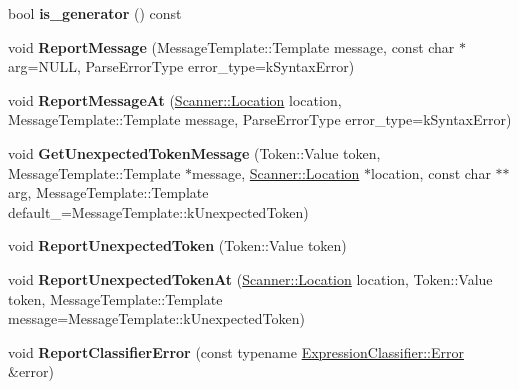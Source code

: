 \begin{DoxyCompactItemize}
\item 
bool {\bfseries is\+\_\+generator} () const \hypertarget{classv8_1_1internal_1_1_parser_base_a62553b4e86b78b41c89deb9d81b0f757}{}\label{classv8_1_1internal_1_1_parser_base_a62553b4e86b78b41c89deb9d81b0f757}

\item 
void {\bfseries Report\+Message} (Message\+Template\+::\+Template message, const char $\ast$arg=N\+U\+LL, Parse\+Error\+Type error\+\_\+type=k\+Syntax\+Error)\hypertarget{classv8_1_1internal_1_1_parser_base_af70a6821f4774d6f814a056f9bea758b}{}\label{classv8_1_1internal_1_1_parser_base_af70a6821f4774d6f814a056f9bea758b}

\item 
void {\bfseries Report\+Message\+At} (\hyperlink{structv8_1_1internal_1_1_scanner_1_1_location}{Scanner\+::\+Location} location, Message\+Template\+::\+Template message, Parse\+Error\+Type error\+\_\+type=k\+Syntax\+Error)\hypertarget{classv8_1_1internal_1_1_parser_base_aa10b6a0282fbc8dbb8ce8864d201769a}{}\label{classv8_1_1internal_1_1_parser_base_aa10b6a0282fbc8dbb8ce8864d201769a}

\item 
void {\bfseries Get\+Unexpected\+Token\+Message} (Token\+::\+Value token, Message\+Template\+::\+Template $\ast$message, \hyperlink{structv8_1_1internal_1_1_scanner_1_1_location}{Scanner\+::\+Location} $\ast$location, const char $\ast$$\ast$arg, Message\+Template\+::\+Template default\+\_\+=Message\+Template\+::k\+Unexpected\+Token)\hypertarget{classv8_1_1internal_1_1_parser_base_a3a593a6ce573b0b498ab79d0d52125cb}{}\label{classv8_1_1internal_1_1_parser_base_a3a593a6ce573b0b498ab79d0d52125cb}

\item 
void {\bfseries Report\+Unexpected\+Token} (Token\+::\+Value token)\hypertarget{classv8_1_1internal_1_1_parser_base_aeeeae0f1a196da2c9e0c157521bcf8b4}{}\label{classv8_1_1internal_1_1_parser_base_aeeeae0f1a196da2c9e0c157521bcf8b4}

\item 
void {\bfseries Report\+Unexpected\+Token\+At} (\hyperlink{structv8_1_1internal_1_1_scanner_1_1_location}{Scanner\+::\+Location} location, Token\+::\+Value token, Message\+Template\+::\+Template message=Message\+Template\+::k\+Unexpected\+Token)\hypertarget{classv8_1_1internal_1_1_parser_base_a8897e34e135f3f466a21e6e4dce9bc8f}{}\label{classv8_1_1internal_1_1_parser_base_a8897e34e135f3f466a21e6e4dce9bc8f}

\item 
void {\bfseries Report\+Classifier\+Error} (const typename \hyperlink{structv8_1_1internal_1_1_expression_classifier_1_1_error}{Expression\+Classifier\+::\+Error} \&error)\hypertarget{classv8_1_1internal_1_1_parser_base_a68f94462c867346641e6688e94120412}{}\label{classv8_1_1internal_1_1_parser_base_a68f94462c867346641e6688e94120412}


\end{DoxyCompactItemize}
